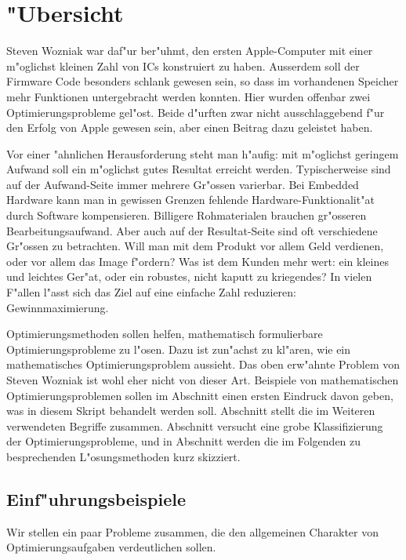 \chapter{"Ubersicht}
\rhead{}
Steven Wozniak war daf"ur ber"uhmt, den ersten Apple-Computer mit
einer m"oglichst kleinen Zahl von ICs konstruiert zu haben.
Ausserdem soll der Firmware Code besonders schlank gewesen sein, so
dass im vorhandenen Speicher mehr Funktionen untergebracht werden 
konnten. Hier wurden offenbar zwei Optimierungsprobleme gel"ost.
Beide d"urften zwar nicht ausschlaggebend f"ur den Erfolg von
Apple gewesen sein, aber einen Beitrag dazu geleistet haben.

Vor einer "ahnlichen Herausforderung steht man h"aufig: mit m"oglichst
geringem Aufwand soll ein m"oglichst gutes Resultat erreicht werden.
Typischerweise sind auf der Aufwand-Seite immer mehrere Gr"ossen varierbar.
Bei Embedded Hardware kann man in gewissen Grenzen
fehlende Hardware-Funktionalit"at durch Software kompensieren.
Billigere Rohmaterialen brauchen gr"osseren Bearbeitungsaufwand.
Aber auch auf der Resultat-Seite sind oft verschiedene Gr"ossen zu
betrachten.
Will man mit dem Produkt vor allem Geld verdienen, oder vor allem
das Image f"ordern?
Was ist dem Kunden mehr wert: ein kleines und leichtes
Ger"at, oder ein robustes, nicht kaputt zu kriegendes? 
In vielen F"allen l"asst sich das Ziel auf eine einfache
Zahl reduzieren: Gewinnmaximierung.

Optimierungsmethoden sollen helfen, mathematisch formulierbare
Optimierungsprobleme zu l"osen. Dazu ist zun"achst zu kl"aren,
wie ein mathematisches Optimierungsproblem aussieht.
Das oben erw"ahnte Problem von Steven Wozniak ist wohl eher nicht
von dieser Art. Beispiele von mathematischen Optimierungsproblemen
sollen im Abschnitt \label{section-einfuehrungsbeispiele} einen
ersten Eindruck davon geben, was in diesem Skript behandelt werden soll.
Abschnitt \label{section-begriffe} stellt die im Weiteren verwendeten
Begriffe zusammen. Abschnitt \label{section-klassifizierung} versucht
eine grobe Klassifizierung der Optimierungsprobleme, und in Abschnitt
\label{section-loesungsuebersicht} werden die im Folgenden zu
besprechenden L"osungsmethoden kurz skizziert.

\section{Einf"uhrungsbeispiele\label{section-einfuehrungsbeispiele}}
Wir stellen ein paar Probleme zusammen, die den allgemeinen Charakter
von Optimierungsaufgaben verdeutlichen sollen.

